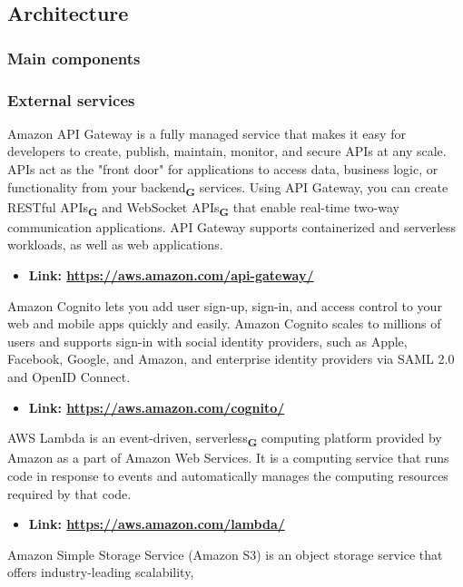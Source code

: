 \subsection{Architecture}
\subsubsection{Main components}
\subsubsection{External services}
Amazon API Gateway is a fully managed service that makes it easy for developers to create, publish, maintain, monitor,
and secure APIs at any scale. APIs act as the "front door" for applications to access data, business logic,
or functionality from your backend\textsubscript{\textbf{G}} services. Using API Gateway, you can create RESTful APIs\textsubscript{\textbf{G}} and WebSocket APIs\textsubscript{\textbf{G}} that
enable real-time two-way communication applications. API Gateway supports containerized and serverless workloads,
as well as web applications.
\begin{itemize}
    \item \textbf{Link: \url{https://aws.amazon.com/api-gateway/}}
\end{itemize}
Amazon Cognito lets you add user sign-up, sign-in, and access control to your web and mobile apps quickly and easily.
Amazon Cognito scales to millions of users and supports sign-in with social identity providers, such as Apple,
Facebook, Google, and Amazon, and enterprise identity providers via SAML 2.0 and OpenID Connect.
\begin{itemize}
    \item \textbf{Link: \url{https://aws.amazon.com/cognito/}}
\end{itemize}
AWS Lambda is an event-driven, serverless\textsubscript{\textbf{G}} computing platform provided by Amazon as a part of Amazon Web Services.
It is a computing service that runs code in response to events and automatically manages the computing resources required by that code.
\begin{itemize}
    \item \textbf{Link: \url{https://aws.amazon.com/lambda/}}
\end{itemize}
Amazon Simple Storage Service (Amazon S3) is an object storage service that offers industry-leading scalability,

